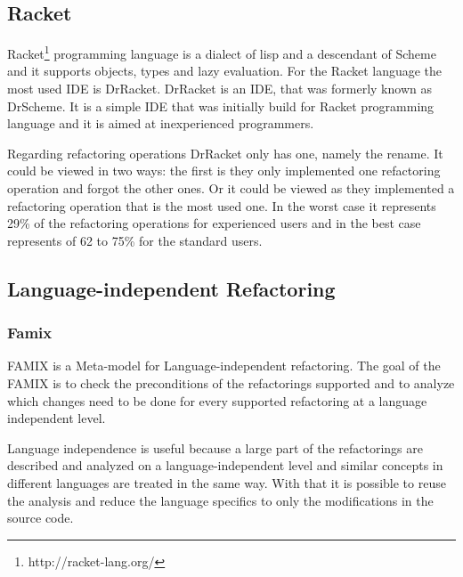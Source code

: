 \subsection{Racket}

Racket\footnote{http://racket-lang.org/} programming language is a dialect of lisp and a descendant of Scheme and it supports objects, types and lazy evaluation.
For the Racket language the most used IDE is DrRacket. 
DrRacket is an IDE, that was formerly known as DrScheme. 
It is a simple IDE that was initially build for Racket programming language and it is aimed at inexperienced programmers.

Regarding refactoring operations DrRacket only has one, namely the rename. 
It could be viewed in two ways: the first is they only implemented one refactoring operation and forgot the other ones.
Or it could be viewed as they implemented a refactoring operation that is the most used one. 
In the worst case it represents 29\% of the refactoring operations for experienced users and in the best case represents of 62 to 75\% for the standard users. 






\subsection{Language-independent Refactoring} %

\subsubsection{Famix}
FAMIX \cite{tichelaar2000meta} is a  Meta-model for Language-independent refactoring.
The goal of the FAMIX is to check the preconditions of the refactorings supported and to analyze which changes need to be done for every supported refactoring at a language independent level.

Language independence is useful because a large part of the refactorings are described and analyzed on a language-independent level and similar concepts in different languages are treated in the same way. 
With that it is possible to reuse the analysis and reduce the language specifics to only the modifications in the source code.

